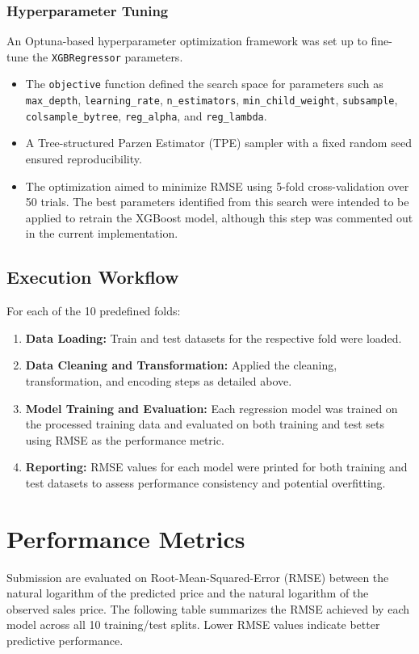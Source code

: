 \documentclass[11pt,a4paper]{article}
\begin{document}
\subsubsection{Hyperparameter Tuning}
An Optuna-based hyperparameter optimization framework was set up to fine-tune
the \texttt{XGBRegressor} parameters.

\begin{itemize}
  \item The \texttt{objective} function defined the search space for parameters such as
        \texttt{max\_depth}, \texttt{learning\_rate}, \texttt{n\_estimators},
        \texttt{min\_child\_weight}, \texttt{subsample}, \texttt{colsample\_bytree},
        \texttt{reg\_alpha}, and \texttt{reg\_lambda}.
  \item A Tree-structured Parzen Estimator (TPE) sampler with a fixed random seed
        ensured reproducibility.
  \item The optimization aimed to minimize RMSE using 5-fold cross-validation over 50
        trials. The best parameters identified from this search were intended to be
        applied to retrain the XGBoost model, although this step was commented out in
        the current implementation.
\end{itemize}

\subsection{Execution Workflow}
For each of the 10 predefined folds:
\begin{enumerate}
  \item \textbf{Data Loading:} Train and test datasets for the respective fold were loaded.
  \item \textbf{Data Cleaning and Transformation:} Applied the cleaning, transformation, and encoding steps as detailed above.
  \item \textbf{Model Training and Evaluation:} Each regression model was trained on the processed training data and evaluated on both training and test sets using RMSE as the performance metric.
  \item \textbf{Reporting:} RMSE values for each model were printed for both training and test datasets to assess performance consistency and potential overfitting.
\end{enumerate}

\section{Performance Metrics}
Submission are evaluated on Root-Mean-Squared-Error (RMSE) between the natural
logarithm of the predicted price and the natural logarithm of the observed
sales price. The following table summarizes the RMSE achieved by each model
across all 10 training/test splits. Lower RMSE values indicate better
predictive performance.
\end{document}
